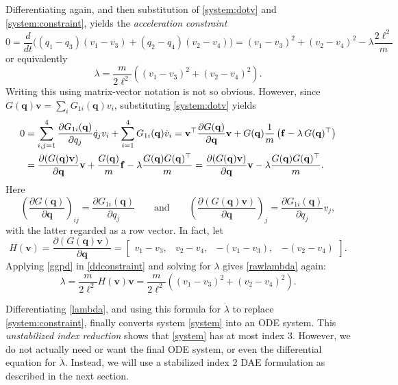 \documentclass[letterpaper,final,12pt,reqno]{amsart}
\newcommand{\bbf}{\mathbf{f}}
\newcommand{\bq}{\mathbf{q}}
\newcommand{\bv}{\mathbf{v}}
\begin{document}
Differentiating again, and then substitution of \eqref{system:dotv} and \eqref{system:constraint}, yields the \emph{acceleration constraint} \cite{Layton1998}
\begin{equation}
0 = \frac{d}{dt} \Big((q_1 - q_3)(v_1 - v_3) + (q_2 - q_4) (v_2 - v_4)\Big) = (v_1 - v_3)^2 + (v_2 - v_4)^2 - \lambda \frac{2 \ell^2}{m} \label{rawddconstraint}
\end{equation}
or equivalently
\begin{equation}
\lambda = \frac{m}{2\ell^2} \left((v_1 - v_3)^2 + (v_2 - v_4)^2\right). \label{rawlambda}
\end{equation}
Writing this using matrix-vector notation is not so obvious.  However, since $G(\bq)\bv = \sum_i G_{1i}(\bq) v_i$, substituting \eqref{system:dotv} yields
\begin{align}
0 &= \sum_{i,j=1}^4 \frac{\partial G_{1i}(\bq)}{\partial q_j} \dot q_j v_i + \sum_{i=1}^4 G_{1i}(\bq) \dot v_i = \bv^\top \frac{\partial G(\bq)}{\partial \bq} \bv + G(\bq) \frac{1}{m} \left(\bbf - \lambda\, G(\bq)^\top\right) \notag \\
  &= \frac{\partial (G(\bq)\bv)}{\partial \bq} \bv +  \frac{G(\bq)}{m} \bbf - \lambda \frac{G(\bq) G(\bq)^\top}{m} = \frac{\partial (G(\bq)\bv)}{\partial \bq} \bv - \lambda \frac{G(\bq) G(\bq)^\top}{m}.  \label{ddconstraint}
\end{align}
Here
\begin{equation}
\left(\frac{\partial G(\bq)}{\partial \bq}\right)_{ij} = \frac{\partial G_{1i}(\bq)}{\partial q_j} \qquad \text{and} \qquad
\left(\frac{\partial (G(\bq)\bv)}{\partial \bq}\right)_{j} = \frac{\partial G_{1i}(\bq)}{\partial q_j} v_j,
\end{equation}
with the latter regarded as a row vector.  In fact, let
\begin{equation}
H(\bv) = \frac{\partial (G(\bq)\bv)}{\partial \bq} = \begin{bmatrix} v_1-v_3, & v_2-v_4, & -(v_1-v_3), & -(v_2-v_4) \end{bmatrix}. \label{velocityconstraintderiv}
\end{equation}
Applying \eqref{ggpd} in \eqref{ddconstraint} and solving for $\lambda$ gives \eqref{rawlambda} again:
\begin{equation}
\lambda = \frac{m}{2\ell^2} H(\bv) \bv = \frac{m}{2\ell^2} \left((v_1 - v_3)^2 + (v_2 - v_4)^2\right). \label{lambda}
\end{equation}

Differentiating \eqref{lambda}, and using this formula for $\dot\lambda$ to replace \eqref{system:constraint}, finally converts system \eqref{system} into an ODE system.  This \emph{unstabilized index reduction} shows that \eqref{system} has at most index 3.  However, we do not actually need or want the final ODE system, or even the differential equation for $\dot \lambda$.  Instead, we will use a stabilized index 2 DAE formulation as described in the next section.
\end{document}

